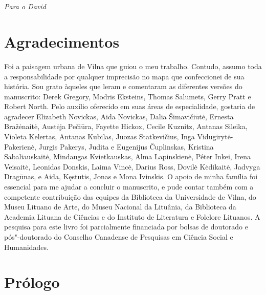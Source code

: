 \chapter*{}
\thispagestyle{empty}

\vfill
\hfill\emph{Para o David}

\chapter{Agradecimentos}

Foi a paisagem urbana de Vilna que guiou o meu trabalho. Contudo, assumo
toda a responsabilidade por qualquer imprecisão no mapa que confeccionei
de sua história. Sou grato àqueles que leram e comentaram as diferentes
versões do manuscrito: Derek Gregory, Modris Eksteins, Thomas Salumets,
Gerry Pratt e Robert North. Pelo auxílio oferecido em suas áreas de
especialidade, gostaria de agradecer Elizabeth Novickas, Aida Novickas,
Dalia Šimavičiūtė, Ernesta Bražėnaitė, Austėja Pečiūra, Fayette Hickox,
Cecile Kuznitz, Antanas Sileika, Violeta Kelertas, Antanas Kubilas,
Juozas Statkevičius, Inga Vidugirytė-Pakerienė, Jurgis Pakerys, Judita e
Eugenijus Čuplinskas, Kristina Sabaliauskaitė, Mindaugas Kvietkauskas,
Alma Lapinskienė, Péter Inkei, Irena Veisaitė, Leonidas Donskis, Laima
Vincė, Darius Ross, Dovilė Kėdikaitė, Jadvyga Dragūnas, e Aida,
Kęstutis, Jonas e Mona Ivinskis. O apoio de minha família foi essencial
para me ajudar a concluir o manuscrito, e pude contar também com a
competente contribuição das equipes da Biblioteca da Universidade de
Vilna, do Museu Lituano de Arte, do Museu Nacional da Lituânia, da
Biblioteca da Academia Lituana de Ciências e do Instituto de Literatura
e Folclore Lituanos. A pesquisa para este livro foi parcialmente
financiada por bolsas de doutorado e pós"-doutorado do Conselho Canadense
de Pesquisas em Ciência Social e Humanidades.

%
%
%
%
%
%
%
%
%
%
%
%
%
%
%

\chapter[Prólogo]{Prólogo }

